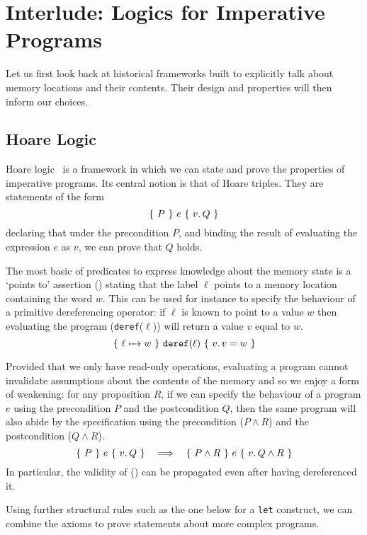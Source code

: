 \section{Interlude: Logics for Imperative Programs}

Let us first look back at historical frameworks built to explicitly
talk about memory locations and their contents.
%
Their design and properties will then inform our choices.

\subsection{Hoare Logic}

Hoare logic~\citeyearpar{DBLP:journals/cacm/Hoare69}  is a framework in
which we can state and prove the properties of imperative programs.
%
Its central notion is that of Hoare triples. They are statements of
the form
\[ \lbrace~ P ~\rbrace~ e ~\lbrace~ v.\, Q ~\rbrace \]
declaring that under the precondition
$P$, and binding the result of evaluating the expression $e$ as $v$,
we can prove that $Q$ holds.

The most basic of predicates to express knowledge about the memory
state is a `points to' assertion () stating that
the label $\ell$ points to a memory location containing the word $w$.
%
\label{sec:deref}
This can be used for instance to specify the behaviour of a primitive
dereferencing operator: if $\ell$ is known to point to a value $w$ then evaluating
the program (\texttt{deref}($\ell$)) will return a value $v$ equal to $w$.
\[ \lbrace~ \ell \xmapsto{~~} w ~\rbrace~ \texttt{deref}(\ell) ~\lbrace~ v.\, v = w ~\rbrace \]

Provided that we only have read-only operations, evaluating a program cannot
invalidate assumptions about the contents of the memory and so we enjoy a
form of weakening: for any proposition $R$, if we can specify the behaviour
of a program $e$ using the precondition $P$ and the postcondition $Q$,
then the same program will also abide by the specification using the
precondition ($P \wedge R$) and the postcondition ($Q \wedge R$).
\[ \lbrace~ P ~\rbrace~ e ~\lbrace~ v.\, Q ~\rbrace \quad \Longrightarrow \quad \lbrace~ P \wedge R ~\rbrace~ e ~\lbrace~ v.\, Q \wedge R ~\rbrace \]
In particular, the validity of () can be propagated even
after having dereferenced it.

Using further structural rules such as the one below for a
\texttt{let} construct, we can combine the axioms to prove
statements about more complex programs.

\newcommand{\letin}[3]{\texttt{let}\,#1\,=\,#2~\texttt{in}~#3}

